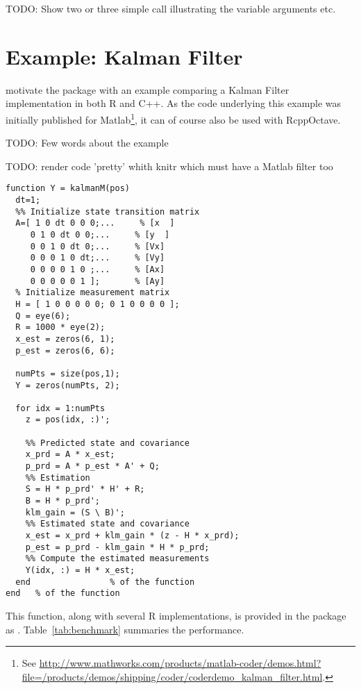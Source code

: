 TODO: Show two or three simple call illustrating the variable arguments etc.

\section{Example: Kalman Filter}

\cite{Eddelbuettel+Sanderson:2012} motivate the  package
with an example comparing a Kalman Filter implementation in both R and
C++. As the code underlying this example was initially published for
Matlab\footnote{See
  \url{http://www.mathworks.com/products/matlab-coder/demos.html?file=/products/demos/shipping/coder/coderdemo_kalman_filter.html}.},
it can of course also be used with RcppOctave.

TODO: Few words about the example

TODO: render code 'pretty' whith knitr which must have a Matlab filter too
\begin{verbatim}
function Y = kalmanM(pos)
  dt=1;
  %% Initialize state transition matrix
  A=[ 1 0 dt 0 0 0;...     % [x  ]
     0 1 0 dt 0 0;...     % [y  ]
     0 0 1 0 dt 0;...     % [Vx]
     0 0 0 1 0 dt;...     % [Vy]
     0 0 0 0 1 0 ;...     % [Ax]
     0 0 0 0 0 1 ];       % [Ay]
  % Initialize measurement matrix
  H = [ 1 0 0 0 0 0; 0 1 0 0 0 0 ];
  Q = eye(6);
  R = 1000 * eye(2);
  x_est = zeros(6, 1);
  p_est = zeros(6, 6);

  numPts = size(pos,1);
  Y = zeros(numPts, 2);

  for idx = 1:numPts
    z = pos(idx, :)';

    %% Predicted state and covariance
    x_prd = A * x_est;
    p_prd = A * p_est * A' + Q;
    %% Estimation
    S = H * p_prd' * H' + R;
    B = H * p_prd';
    klm_gain = (S \ B)';
    %% Estimated state and covariance
    x_est = x_prd + klm_gain * (z - H * x_prd);
    p_est = p_prd - klm_gain * H * p_prd;
    %% Compute the estimated measurements
    Y(idx, :) = H * x_est;
  end                % of the function
end   % of the function
\end{verbatim}

This function, along with several R implementations, is provided in the
 package as . %
Table~\ref{tab:benchmark} summaries the performance.



